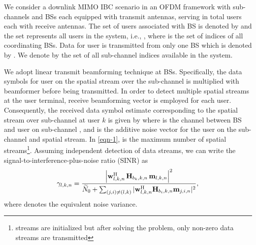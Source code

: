 We consider a downlink \ac{MIMO} \ac{IBC} scenario in an \ac{OFDM} framework with  sub-channels and  \acp{BS} each equipped with  transmit antennas, serving in total  users each with  receive antennas. The set of users associated with \ac{BS}  is denoted by  and the set  represents all users in the system, i.e., , where  is the set of indices of all coordinating \acp{BS}. Data for user  is transmitted from only one \ac{BS} which is denoted by . We denote by  the set of all sub-channel indices available in the system.

We adopt linear transmit beamforming technique at \acp{BS}. Specifically, the data symbols  for  user  on the  spatial stream over the sub-channel  is multiplied with beamformer  before being transmitted. In order to detect  multiple spatial streams at the user terminal, receive beamforming vector  is employed for each user. Consequently, the received data symbol estimate corresponding to the  spatial stream over sub-channel  at user $k$ is given by
\iftoggle{single_column}{
\begin{equation}\label{eqn-1}
\hat{d}_{l,k,n} = \mvec{w}{l,k,n}^\herm \mvec{H}{b_k,k,n} \,\mvec{m}{l,k,n} d_{l,k,n} + \mvec{w}{l,k,n}^\herm \sum_{i \in \mc{U} \backslash \set{k}} \mvec{H}{b_i,k,n} \sum_{j = 1}^L \mvec{m}{j,i,n}d_{j,i,n} + \mvec{w}{l,k,n}^\herm \mvec{n}{k,n},
\end{equation}
}{
\begin{multline}\label{eqn-1}
\hat{d}_{l,k,n} = \mvec{w}{l,k,n}^\herm \mvec{H}{b_k,k,n} \,\mvec{m}{l,k,n} d_{l,k,n} + \mvec{w}{l,k,n}^\herm \mvec{n}{k,n} \\ 
+ \mvec{w}{l,k,n}^\herm \sum_{i \in \mc{U} \backslash \set{k}} \mvec{H}{b_i,k,n} \sum_{j = 1}^L \mvec{m}{j,i,n}d_{j,i,n},
\end{multline}
}
where  is the channel between \ac{BS}  and  user  on sub-channel , and   is the additive noise vector for the user  on the  sub-channel and  spatial stream. In \eqref{eqn-1},  is the maximum number of spatial streams\footnote{ streams are initialized but after solving the problem, only  non-zero data streams are transmitted}. Assuming independent detection of data streams, we can write the signal-to-interference-plus-noise ratio (SINR) as
\begin{equation}\label{eq:SINR}
\gamma_{l,k,n} = \dfrac{\left |\mvec{w}{l,k,n}^\herm \, \mvec{H}{b_k,k,n} \, \mvec{m}{l,k,n} \right |^2}{\enoise + \sum_{(j,i) \neq (l,k)} |\mvec{w}{l,k,n}^\herm \mvec{H}{b_i,k,n} \mvec{m}{j,i,n} |^2},
\end{equation}
where  denotes the equivalent noise variance.

